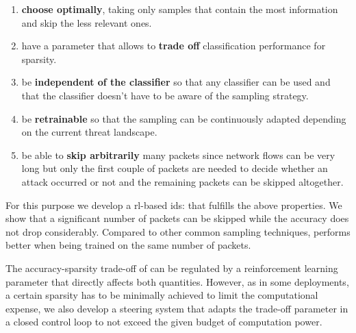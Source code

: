 \documentclass[conference]{IEEEtran}
\begin{document}
\begin{enumerate}
\item \textbf{choose optimally}, taking only samples that contain the most information and skip the less relevant ones.
\item have a parameter that allows to \textbf{trade off} classification performance for sparsity.
\item be \textbf{independent of the classifier} so that any classifier can be used and that the classifier doesn't have to be aware of the sampling strategy.
\item be \textbf{retrainable} so that the sampling can be continuously adapted depending on the current threat landscape.
\item be able to \textbf{skip arbitrarily} many packets since network flows can be very long but only the first couple of packets are needed to decide whether an attack occurred or not and the remaining packets can be skipped altogether.
\end{enumerate}



For this purpose we develop a \gls{rl}-based \gls{ids}: \textit{\ours{}} that fulfills the above properties. We show that a significant number of packets can be skipped while the accuracy does not drop
considerably. Compared to other common sampling techniques, \ours{} performs better when being trained on the same number of packets.


The accuracy-sparsity trade-off of \ours{} can be regulated by a reinforcement learning parameter that directly affects both quantities. However, as in some deployments, a certain sparsity has to be minimally achieved to limit the computational expense, we also develop a steering system that adapts the trade-off parameter in a closed control loop to not exceed the given budget of computation power.
\end{document}
